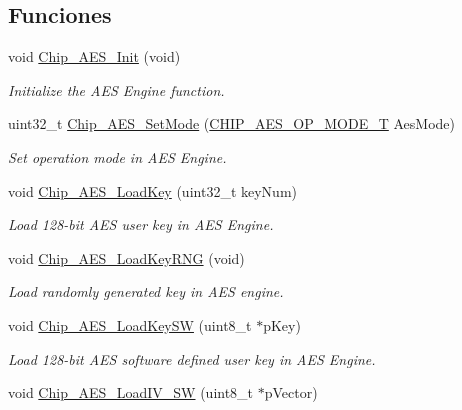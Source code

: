 \subsection*{Funciones}
\begin{DoxyCompactItemize}
\item 
void \hyperlink{group___a_e_s__18_x_x__43_x_x_gafdf5bd7d491d506493c5989097221f2b}{Chip\+\_\+\+A\+E\+S\+\_\+\+Init} (void)
\begin{DoxyCompactList}\small\item\em Initialize the A\+ES Engine function. \end{DoxyCompactList}\item 
uint32\+\_\+t \hyperlink{group___a_e_s__18_x_x__43_x_x_gaa78732f8682a60cb228dc9c11bf18484}{Chip\+\_\+\+A\+E\+S\+\_\+\+Set\+Mode} (\hyperlink{group___a_e_s__18_x_x__43_x_x_ga8dd50510d4144a9b12042487fdd42813}{C\+H\+I\+P\+\_\+\+A\+E\+S\+\_\+\+O\+P\+\_\+\+M\+O\+D\+E\+\_\+T} Aes\+Mode)
\begin{DoxyCompactList}\small\item\em Set operation mode in A\+ES Engine. \end{DoxyCompactList}\item 
void \hyperlink{group___a_e_s__18_x_x__43_x_x_gaa72ef978d5d346c71a7db8d9d9d5e2a7}{Chip\+\_\+\+A\+E\+S\+\_\+\+Load\+Key} (uint32\+\_\+t key\+Num)
\begin{DoxyCompactList}\small\item\em Load 128-\/bit A\+ES user key in A\+ES Engine. \end{DoxyCompactList}\item 
void \hyperlink{group___a_e_s__18_x_x__43_x_x_ga42594f5deded064b6f03ee79af7d0aa8}{Chip\+\_\+\+A\+E\+S\+\_\+\+Load\+Key\+R\+NG} (void)
\begin{DoxyCompactList}\small\item\em Load randomly generated key in A\+ES engine. \end{DoxyCompactList}\item 
void \hyperlink{group___a_e_s__18_x_x__43_x_x_ga395abcf71c77a979c3ce44c8e4d7abe9}{Chip\+\_\+\+A\+E\+S\+\_\+\+Load\+Key\+SW} (uint8\+\_\+t $\ast$p\+Key)
\begin{DoxyCompactList}\small\item\em Load 128-\/bit A\+ES software defined user key in A\+ES Engine. \end{DoxyCompactList}\item 
void \hyperlink{group___a_e_s__18_x_x__43_x_x_ga9585571d1a075ed01c739217ca65ffbc}{Chip\+\_\+\+A\+E\+S\+\_\+\+Load\+I\+V\+\_\+\+SW} (uint8\+\_\+t $\ast$p\+Vector)

\end{DoxyCompactItemize}
